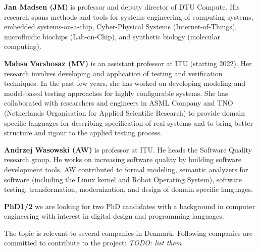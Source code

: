 \documentclass[fleqn,12pt]{article}
\newcommand{\todo}[1]{{\it TODO: #1}}
\begin{document}
{\bf Jan Madsen (JM)} is professor and deputy director of DTU Compute.
His research spans methods
and tools for systems engineering of computing systems, embedded systems-on-a-chip,
Cyber-Physical Systems (Internet-of-Things), microfluidic biochips (Lab-on-Chip), and
synthetic biology (molecular computing).


{\bf Mahsa Varshosaz (MV)} is an assistant professor at ITU (starting 2022). Her research involves developing and application of testing and verification techniques. In the past few years, she has worked on developing modeling and model-based testing approaches for highly configurable systems. She has collaborated with researchers and engineers in ASML Company and TNO (Netherlands Organisation for Applied Scientific Research) to provide domain specific languages for describing specification of real systems and to bring better structure and rigour to the applied testing process.

{\bf Andrzej Wasowski (AW)} is professor at ITU. He heads the Software Quality research group.  He works on increasing software quality by building software development tools. AW contributed to formal modeling, semantic analyzers for software (including the Linux kernel and Robot Operating System), software testing, transformation, modernization, and design of domain specific languages.


{\bf PhD1/2} we are looking for two PhD candidates with a background in computer engineering
with interest in digital design and programming languages.

The topic is relevant to several companies in Denmark. Following companies are committed to contribute to the project: \todo{list them}
\end{document}
